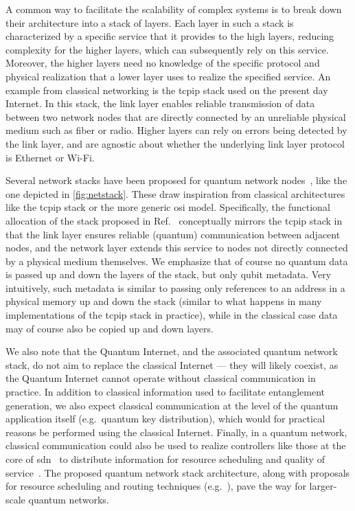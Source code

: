 A common way to facilitate the scalability of complex systems is to break down their architecture
into a stack of layers. Each layer in such a stack is characterized by a specific service that it
provides to the high layers, reducing complexity for the higher layers, which can subsequently rely
on this service. Moreover, the higher layers need no knowledge of the specific protocol and physical
realization that a lower layer uses to realize the specified service. An example from classical
networking is the \acrshort{tcpip} stack used on the present day Internet. In this stack, the link
layer enables reliable transmission of data between two network nodes that are directly connected by
an unreliable physical medium such as fiber or radio. Higher layers can rely on errors being
detected by the link layer, and are agnostic about whether the underlying link layer protocol is
Ethernet or Wi-Fi.

Several network stacks have been proposed for quantum network nodes~\cite{dahlberg_2019_egp,
pirker_2019_quantum, kozlowski_2020_qnp}, like the one depicted in \cref{fig:netstack}. These draw
inspiration from classical architectures like the \acrshort{tcpip} stack or the more generic
\acrfull{osi} model. Specifically, the functional allocation of the stack proposed in
Ref.~\cite{dahlberg_2019_egp} conceptually mirrors the \acrshort{tcpip} stack in that the link layer
ensures reliable (quantum) communication between adjacent nodes, and the network layer extends this
service to nodes not directly connected by a physical medium themselves. We emphasize that of course
no quantum data is passed up and down the layers of the stack, but only qubit metadata. Very
intuitively, such metadata is similar to passing only references to an address in a physical memory
up and down the stack (similar to what happens in many implementations of the \acrshort{tcpip} stack
in practice), while in the classical case data may of course also be copied up and down layers.

We also note that the Quantum Internet, and the associated quantum network stack, do not aim to
replace the classical Internet --- they will likely coexist, as the Quantum Internet cannot operate
without classical communication in practice. In addition to classical information used to facilitate
entanglement generation, we also expect classical communication at the level of the quantum
application itself (e.g.~quantum key distribution), which would for practical reasons be performed
using the classical Internet. Finally, in a quantum network, classical communication could also be
used to realize controllers like those at the core of \acrfull{sdn}~\cite{ferguson_2021_orion} to
distribute information for resource scheduling and quality of service~\cite{skrzypczyk_2021_arch}.
The proposed quantum network stack architecture, along with proposals for resource scheduling and
routing techniques (e.g.~\cite{van_meter_2013_path, caleffi_2017_optimal,
gyongyosi_2018_decentralized, pant_2019_routing, chakraborty_2019_distributed, shi_2020_concurrent,
chakraborty_2020_entanglement, skrzypczyk_2021_arch}), pave the way for larger-scale quantum
networks.

